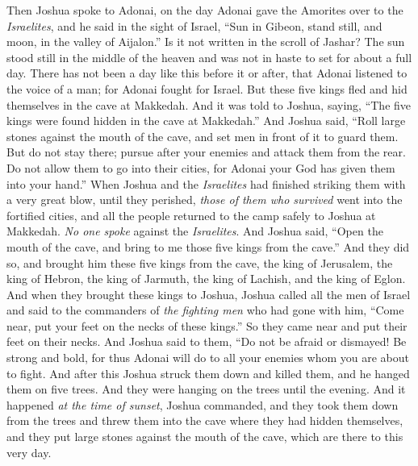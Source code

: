 \begin{biblechapter}
\verse Then Joshua spoke to Adonai, on the day Adonai gave the Amorites over to the \textit{Israelites}, and he said in the sight of Israel,
\verse “Sun in Gibeon, stand still, 
and moon, in the valley of Aijalon.”
\verse Is it not written in the scroll of Jashar? The sun stood still in the middle of the heaven and was not in haste to set for about a full day.
\verse There has not been a day like this before it or after, that Adonai listened to the voice of a man; for Adonai fought for Israel.
 But these five kings fled and hid themselves in the cave at Makkedah.
\verse And it was told to Joshua, saying, “The five kings were found hidden in the cave at Makkedah.”
\verse And Joshua said, “Roll large stones against the mouth of the cave, and set men in front of it to guard them.
\verse But do not stay there; pursue after your enemies and attack them from the rear. Do not allow them to go into their cities, for Adonai your God has given them into your hand.”
\verse When Joshua and the \textit{Israelites} had finished striking them with a very great blow, until they perished, \textit{those of them who survived} went into the fortified cities,
\verse and all the people returned to the camp safely to Joshua at Makkedah. \textit{No one spoke} against the \textit{Israelites}.
\verse And Joshua said, “Open the mouth of the cave, and bring to me those five kings from the cave.”
\verse And they did so, and brought him these five kings from the cave, the king of Jerusalem, the king of Hebron, the king of Jarmuth, the king of Lachish, and the king of Eglon.
\verse And when they brought these kings to Joshua, Joshua called all the men of Israel and said to the commanders of \textit{the fighting men} who had gone with him, “Come near, put your feet on the necks of these kings.” So they came near and put their feet on their necks.
\verse And Joshua said to them, “Do not be afraid or dismayed! Be strong and bold, for thus Adonai will do to all your enemies whom you are about to fight.
\verse And after this Joshua struck them down and killed them, and he hanged them on five trees. And they were hanging on the trees until the evening.
\verse And it happened \textit{at the time of sunset}, Joshua commanded, and they took them down from the trees and threw them into the cave where they had hidden themselves, and they put large stones against the mouth of the cave, which are there to this very day.

\end{biblechapter}
